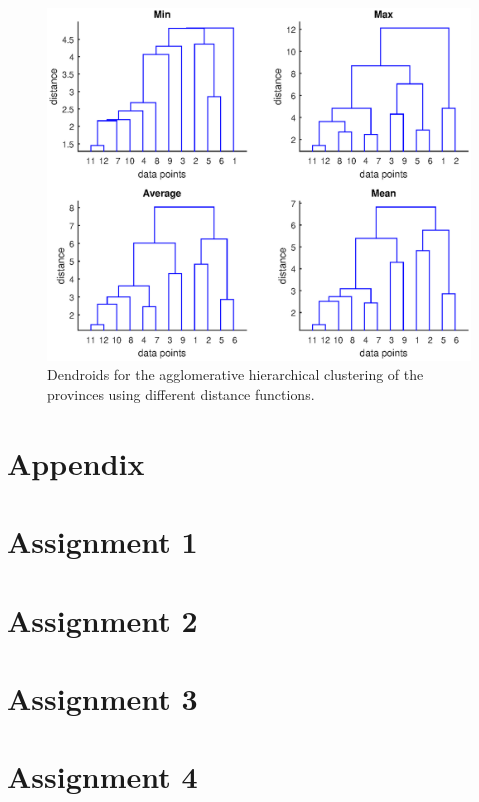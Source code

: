 \documentclass[10pt]{article}
\begin{document}
\begin{figure}
	\includegraphics[width=\columnwidth]{Ass4.eps}
	\caption{Dendroids for the agglomerative hierarchical clustering of the provinces using different distance functions.}
	\label{fig4}
\end{figure}

\newpage
\section*{Appendix}
\appendix
\section{Assignment 1}
{\label{Minkowski}}
\section{Assignment 2}
{\label{Ass2}}
\section{Assignment 3}
{\label{Ass3}}
\section{Assignment 4}
{\label{Ass4}}
\end{document}
